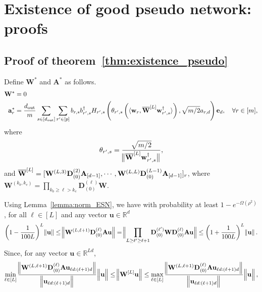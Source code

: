 \section{Existence of good pseudo network: proofs}
\subsection{Proof of theorem~\ref{thm:existence_pseudo}}
\begin{definition} 
	Define $\mathbf{W}^{\ast}$ and $\mathbf{A}^{\ast}$ as follows.
	\begin{align*}
		\mathbf{W}^{\ast} &= 0 \\
		\mathbf{a}^{*}_{r} &= \frac{d_{\mathrm{out}} }{m} \sum_{s \in [d_{\mathrm{out}} ]} \sum_{r' \in [p]} b_{r, s} b_{r', s}^{\dagger} H_{r', s} \left(\theta_{r', s} \left(\langle \mathbf{w}_{r}, \overline{\mathbf{W}}^{[L]} \mathbf{w}_{r', s}^{\dagger}\rangle\right), \sqrt{m/2} a_{r, d}\right) \mathbf{e}_d, \quad \forall r \in [m],
	\end{align*}
	where
	\begin{equation*} 
		\theta_{r', s} = \frac{\sqrt{m/2}}{\norm[1]{ \overline{\mathbf{W}}^{[L]} \mathbf{w}_{r', s}^{\dagger}}},
	\end{equation*}
	and $\overline{\mathbf{W}}^{[L]} = [\mathbf{W}^{(L, 3)} \mathbf{D}_{(0)}^{(2)}\mathbf{A}_{[d-1]},  \cdots, \mathbf{W}^{(L, L)} 
	\mathbf{D}_{(0)}^{(L-1)}\mathbf{A}_{[d-1]}]_r$, where $\mathbf{W}^{(k_b, k_e)} = \prod_{k_b \ge \ell > k_e} \mathbf{D}_{(0)}^{(\ell)} \mathbf{W}$.
\end{definition}
Using Lemma~\ref{lemma:norm_ESN}, we have with probability at least $ 1-e^{-\Omega(\rho^2)}$, for all $\ell \in [L]$ and any vector $\mathbf{u} \in \mathbb{R}^{d}$
\begingroup \allowdisplaybreaks
\begin{align*}
	\left(1 - \frac{1}{100L}\right)^{L} \norm{\mathbf{u}} \le \norm[2]{\mathbf{W}^{(L, \ell+1)} \mathbf{D}^{(\ell)}_{(0)} \mathbf{A} \mathbf{u}} = \norm[2]{\prod_{L \ge \ell' \ge \ell+1} \mathbf{D}_{(0)}^{(\ell')} \mathbf{W} \mathbf{D}_{(0)}^{(\ell)} \mathbf{A} \mathbf{u}} \le \left(1 + \frac{1}{100L}\right)^{L} \norm{\mathbf{u}}.
\end{align*} 
\endgroup
Since, for any vector $\mathbf{u} \in \mathbb{R}^{Ld}$,
\begin{align*}
	\min_{\ell \in [L]} \frac{\norm[2]{\mathbf{W}^{(L, \ell+1)} \mathbf{D}^{(\ell)}_{(0)} \mathbf{A} \mathbf{u}_{\ell d : (\ell + 1)d}}}{\norm[2]{\mathbf{u}_{\ell d : (\ell + 1)d}}} \norm[2]{\mathbf{u}} \le \norm[2]{\mathbf{W}^{[L]} \mathbf{u}} \le \max_{\ell \in [L]} \frac{\norm[2]{\mathbf{W}^{(L, \ell+1)} \mathbf{D}^{(\ell)}_{(0)} \mathbf{A} \mathbf{u}_{\ell d : (\ell + 1)d}}}{\norm[2]{\mathbf{u}_{\ell d : (\ell + 1)d}}} \norm[2]{\mathbf{u}},
\end{align*}
